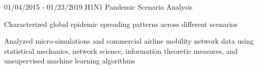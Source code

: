 \begin{cventries}
\begin{cventries}
  \cventryfour
  	{} %
    {} %
    {} %
    {01/04/2015 - 01/23/2019} %
    {H1N1 Pandemic Scenario Analysis}
    {
      \begin{cvitems} %
        \item {Characterized global epidemic spreading patterns across different scenarios}
    \item {Analyzed micro-simulations and commercial airline mobility network data using statistical mechanics, network science, information theoretic measures, and unsupervised machine learning algorithms}
      \end{cvitems}
    }


\end{cventries}
\end{cventries}
